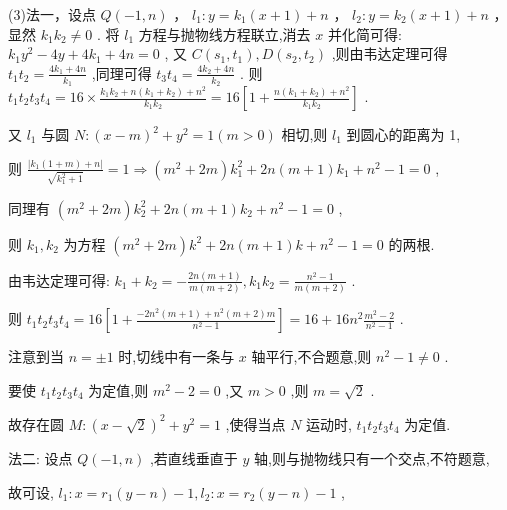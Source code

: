 \documentclass[10pt]{article}
\begin{document}
(3)法一，设点 \(Q\left( {-1,n}\right)\) ， \({l}_{1} : y = {k}_{1}\left( {x + 1}\right)  + n\) ， \({l}_{2} : y = {k}_{2}\left( {x + 1}\right)  + n\) ，显然 \({k}_{1}{k}_{2} \neq  0\) . 将 \({l}_{1}\) 方程与抛物线方程联立,消去 \(x\) 并化简可得: \({k}_{1}{y}^{2} - {4y} + 4{k}_{1} + {4n} = 0\) , 又 \(C\left( {{s}_{1},{t}_{1}}\right) ,D\left( {{s}_{2},{t}_{2}}\right)\) ,则由韦达定理可得 \({t}_{1}{t}_{2} = \frac{4{k}_{1} + {4n}}{{k}_{1}}\) ,同理可得 \({t}_{3}{t}_{4} = \frac{4{k}_{2} + {4n}}{{k}_{2}}\) . 则 \({t}_{1}{t}_{2}{t}_{3}{t}_{4} = {16} \times  \frac{{k}_{1}{k}_{2} + n\left( {{k}_{1} + {k}_{2}}\right)  + {n}^{2}}{{k}_{1}{k}_{2}} = {16}\left\lbrack  {1 + \frac{n\left( {{k}_{1} + {k}_{2}}\right)  + {n}^{2}}{{k}_{1}{k}_{2}}}\right\rbrack\) .

又 \({l}_{1}\) 与圆 \(N : {\left( x - m\right) }^{2} + {y}^{2} = 1\left( {m > 0}\right)\) 相切,则 \({l}_{1}\) 到圆心的距离为 1,

则 \(\frac{\left| {k}_{1}\left( 1 + m\right)  + n\right| }{\sqrt{{k}_{1}^{2} + 1}} = 1 \Rightarrow  \left( {{m}^{2} + {2m}}\right) {k}_{1}^{2} + {2n}\left( {m + 1}\right) {k}_{1} + {n}^{2} - 1 = 0\) ,

同理有 \(\left( {{m}^{2} + {2m}}\right) {k}_{2}^{2} + {2n}\left( {m + 1}\right) {k}_{2} + {n}^{2} - 1 = 0\) ,

则 \({k}_{1},{k}_{2}\) 为方程 \(\left( {{m}^{2} + {2m}}\right) {k}^{2} + {2n}\left( {m + 1}\right) k + {n}^{2} - 1 = 0\) 的两根.

由韦达定理可得: \({k}_{1} + {k}_{2} =  - \frac{{2n}\left( {m + 1}\right) }{m\left( {m + 2}\right) },{k}_{1}{k}_{2} = \frac{{n}^{2} - 1}{m\left( {m + 2}\right) }\) .

则 \({t}_{1}{t}_{2}{t}_{3}{t}_{4} = {16}\left\lbrack  {1 + \frac{-2{n}^{2}\left( {m + 1}\right)  + {n}^{2}\left( {m + 2}\right) m}{{n}^{2} - 1}}\right\rbrack   = {16} + {16}{n}^{2}\frac{{m}^{2} - 2}{{n}^{2} - 1}\) .

注意到当 \(n =  \pm  1\) 时,切线中有一条与 \(x\) 轴平行,不合题意,则 \({n}^{2} - 1 \neq  0\) .

要使 \({t}_{1}{t}_{2}{t}_{3}{t}_{4}\) 为定值,则 \({m}^{2} - 2 = 0\) ,又 \(m > 0\) ,则 \(m = \sqrt{2}\) .

故存在圆 \(M : {\left( x - \sqrt{2}\right) }^{2} + {y}^{2} = 1\) ,使得当点 \(N\) 运动时, \({t}_{1}{t}_{2}{t}_{3}{t}_{4}\) 为定值.

法二: 设点 \(Q\left( {-1,n}\right)\) ,若直线垂直于 \(y\) 轴,则与抛物线只有一个交点,不符题意,

故可设, \({l}_{1} : x = {r}_{1}\left( {y - n}\right)  - 1,{l}_{2} : x = {r}_{2}\left( {y - n}\right)  - 1\) ,
\end{document}

